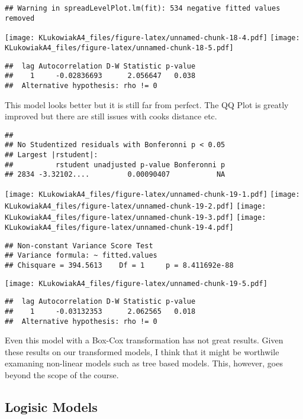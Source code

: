 \documentclass[]{article}
\begin{document}
\begin{verbatim}
## Warning in spreadLevelPlot.lm(fit): 534 negative fitted values removed
\end{verbatim}

\texttt{[image: KLukowiakA4\_files/figure-latex/unnamed-chunk-18-4.pdf]}
\texttt{[image: KLukowiakA4\_files/figure-latex/unnamed-chunk-18-5.pdf]}

\begin{verbatim}
##  lag Autocorrelation D-W Statistic p-value
##    1     -0.02836693      2.056647   0.038
##  Alternative hypothesis: rho != 0
\end{verbatim}

This model looks better but it is still far from perfect. The QQ Plot is
greatly improved but there are still issues with cooks distance etc.

\begin{verbatim}
## 
## No Studentized residuals with Bonferonni p < 0.05
## Largest |rstudent|:
##          rstudent unadjusted p-value Bonferonni p
## 2834 -3.32102....         0.00090407           NA
\end{verbatim}

\texttt{[image: KLukowiakA4\_files/figure-latex/unnamed-chunk-19-1.pdf]}
\texttt{[image: KLukowiakA4\_files/figure-latex/unnamed-chunk-19-2.pdf]}
\texttt{[image: KLukowiakA4\_files/figure-latex/unnamed-chunk-19-3.pdf]}
\texttt{[image: KLukowiakA4\_files/figure-latex/unnamed-chunk-19-4.pdf]}

\begin{verbatim}
## Non-constant Variance Score Test 
## Variance formula: ~ fitted.values 
## Chisquare = 394.5613    Df = 1     p = 8.411692e-88
\end{verbatim}

\texttt{[image: KLukowiakA4\_files/figure-latex/unnamed-chunk-19-5.pdf]}

\begin{verbatim}
##  lag Autocorrelation D-W Statistic p-value
##    1     -0.03132353      2.062565   0.018
##  Alternative hypothesis: rho != 0
\end{verbatim}

Even this model with a Box-Cox transformation has not great results.
Given these results on our transformed models, I think that it might be
worthwile examaning non-linear models such as tree based models. This,
however, goes beyond the scope of the course.

\hypertarget{logisic-models}{%
\subsection{Logisic Models}\label{logisic-models}}
\end{document}
